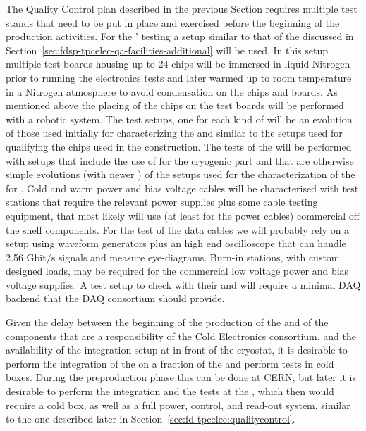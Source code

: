 The Quality Control plan described in the previous Section requires
multiple test stands that need to be put in place and exercised 
before the beginning of the production activities. For the '
testing a setup similar to that of the  discussed in
Section~\ref{sec:fdsp-tpcelec-qa-facilities-additional} will
be used. In this setup multiple test boards housing up to 24
chips will be immersed in liquid Nitrogen prior to running the
electronics tests and later warmed up to room temperature in 
a Nitrogen atmosphere to avoid condensation on the chips and
boards. As mentioned above the placing of the chips on the test 
boards will be performed with a robotic system. The test setups,
one for each kind of  will be an evolution of those
used initially for characterizing the  and similar
to the setups used for qualifying the chips used in the 
construction. The tests of the  will be performed with
setups that include the use of  for the cryogenic part
and that are otherwise simple evolutions (with newer )
of the setups used for the characterization of the 
for . Cold and warm power and bias voltage cables will
be characterised with test stations that require the relevant 
power supplies plus some cable testing equipment, that most likely will
use (at least for the power cables) commercial off the shelf components.
For the test of the data cables we will probably rely on a setup
using waveform generators plus an high end oscilloscope that 
can handle 2.56 Gbit/s signals and measure eye-diagrams. 
Burn-in stations, with custom designed loads, may be required for 
the commercial low voltage power and bias voltage supplies.
A test setup to check  with their 
and  will require a minimal DAQ backend that the
DAQ consortium should provide.

Given the delay between the beginning of the production of the
 and of the components that are a responsibility of
the Cold  Electronics consortium, and the availability of the
integration setup at \surf in front of the cryostat, it is
desirable to  perform the integration of the 
on a fraction of the  and perform tests in cold
boxes. During the preproduction phase this can be done at CERN,
but later it is desirable to perform the integration and the
tests at the , which then would require a cold box,
as well as a full power, control, and read-out system, similar
to the one described later in Section~\ref{sec:fd-tpcelec:qualitycontrol}.
